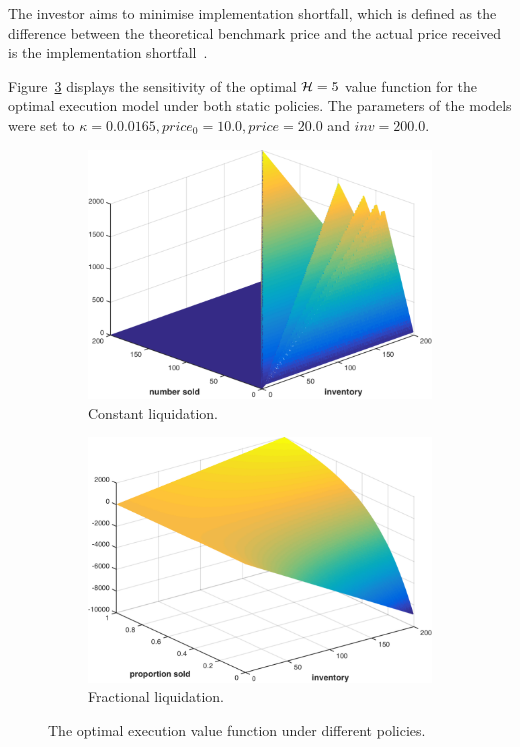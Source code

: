 The investor aims to minimise implementation shortfall, which is defined as the difference between the theoretical benchmark price and the actual price received is the implementation shortfall~\parencite{Perold_JPM_1988}.

Figure~\ref{fig:opt_execution} displays the sensitivity of the optimal {\footnotesize$ \mathcal{H} = 5 $} value function for the optimal execution model under both static policies. The parameters of the models were set to {\footnotesize$ \kappa = 0.0.0165, price_0 = 10.0, price = 20.0$} and {\footnotesize$inv = 200.0$}. 
\begin{figure}[t!]
    \centering
    \begin{subfigure}[b]{0.4\textwidth}    
        \includegraphics[width=\linewidth, height=0.6\linewidth]{images/opt_execution_budget}
        \caption{Constant liquidation.}
        \label{fig:opt_execution_w1}
        \vspace{1em}
    \end{subfigure}
    
    \begin{subfigure}[b]{0.4\textwidth}    
        \includegraphics[width=\linewidth, height=0.6\linewidth]{images/opt_execution_fraction}
        \caption{Fractional liquidation.}
        \label{fig:opt_execution_w2}
    \end{subfigure}  
    \caption{The optimal execution value function under different policies.}
    \label{fig:opt_execution}
\end{figure}
